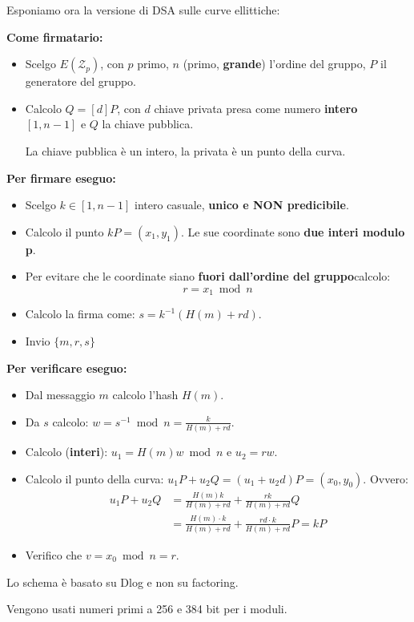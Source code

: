 Esponiamo ora la versione di DSA sulle curve ellittiche:
\begin{definition}\label{def:ecdsa}
\textbf{Come firmatario:}
\begin{itemize}
    \item Scelgo $E(\mathcal{Z}_p)$, con $p$ primo, $n$ (primo, \textbf{grande}) l'ordine del gruppo, $P$ il generatore del gruppo.
    \item Calcolo $Q=[d]P$, con $d$ chiave privata presa come numero \textbf{intero} $[1,n-1]$ e $Q$ la chiave pubblica.\\
    \begin{remark}
    La chiave pubblica è un intero, la privata è un punto della curva.
    \end{remark}
\end{itemize}
\textbf{Per firmare eseguo:}
\begin{itemize}
    \item Scelgo $k\in[1,n-1]$ intero casuale, \textbf{unico e NON predicibile}.
    \item Calcolo il punto $kP=(x_1,y_1)$. Le sue coordinate sono \textbf{due interi modulo p}.
    \item Per evitare che le coordinate siano \textbf{fuori dall'ordine del gruppo}\footnotemark calcolo:
    \[r=x_1\bmod n\]
    \item Calcolo la firma come: $s=k^{-1}(H(m)+rd)$.
    \item Invio $\{m,r,s\}$
\end{itemize}
\textbf{Per verificare eseguo:}
\begin{itemize}
    \item Dal messaggio $m$ calcolo l'hash $H(m)$.
    \item Da $s$ calcolo: $w=s^{-1}\bmod n=\frac{k}{H(m)+rd}$.
    \item Calcolo (\textbf{interi}): $u_1=H(m)w\bmod n$ e $u_2=rw$.
    \item Calcolo il punto della curva: $u_1P+u_2Q=(u_1+u_2d)P=(x_0,y_0)$. Ovvero:
    \begin{equation*}
        \begin{aligned}
            u_1P+u_2Q&=\frac{H(m)k}{H(m)+rd}+\frac{rk}{H(m)+rd}Q\\
            &=\frac{H(m)\cdot k}{H(m)+rd}+\frac{rd\cdot k}{H(m)+rd}P=kP
        \end{aligned}
    \end{equation*}
    \item Verifico che $v=x_0\bmod n=r$.
\end{itemize}
\begin{remark}
Lo schema è basato su Dlog e non su factoring.
\end{remark}
Vengono usati numeri primi a 256 e 384 bit per i moduli.
\end{definition}
